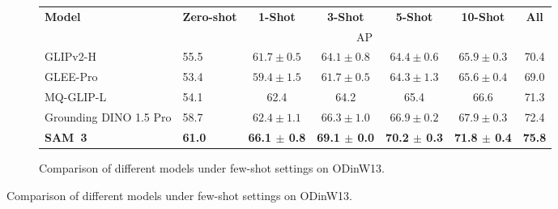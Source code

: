 \documentclass[]{fairmeta}
\newcommand{\myappendixtablesize}{8}
\newcommand{\myappendixtablebaselineskip}{9.5}
\newcommand{\model}{SAM~3\xspace}
\begin{document}
	
	
	
	\begin{figure}[htbp!]
		\centering
		\begin{subfigure}{\textwidth}
			\centering
			{\fontsize{\myappendixtablesize}{\myappendixtablebaselineskip}\selectfont
				\begin{tabular}{llccccc}
					\textbf{Model} & \textbf{Zero-shot} & \textbf{1-Shot} & \textbf{3-Shot} & \textbf{5-Shot} & \textbf{10-Shot} & \textbf{All} \\
					\cmidrule(lr){2-7}
					& \multicolumn{6}{c}{AP} \\
					\midrule
					GLIPv2-H      & 55.5 & $61.7 \pm 0.5$ & $64.1 \pm 0.8$ & $64.4 \pm 0.6$ & $65.9 \pm 0.3$ & 70.4 \\
					GLEE-Pro      & 53.4 & $59.4 \pm 1.5$ & $61.7 \pm 0.5$ & $64.3 \pm 1.3$ & $65.6 \pm 0.4$ & 69.0 \\
					MQ-GLIP-L     & 54.1 & 62.4           & 64.2           & 65.4           & 66.6           & 71.3 \\
					Grounding DINO 1.5 Pro & 58.7 & $62.4 \pm 1.1$ & $66.3 \pm 1.0$ & $66.9 \pm 0.2$ & $67.9 \pm 0.3$ & 72.4 \\
					\midrule
					\textbf{\model} & \textbf{61.0}
					& \textbf{66.1 $\pm$ 0.8} & \textbf{69.1 $\pm$ 0.0} & \textbf{70.2 $\pm$ 0.3} & \textbf{71.8 $\pm$ 0.4} & \textbf{75.8} \\
				\end{tabular}
			}
			\caption{Comparison of different models under few-shot settings on ODinW13.}
			\label{tab:odinw_fewshot}
		\end{subfigure}
		
		\vspace{5pt}
		

\end{figure}
\end{document}
